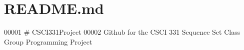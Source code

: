 \hypertarget{README_8md_source}{}\section{R\+E\+A\+D\+M\+E.\+md}

\begin{DoxyCode}
00001 # CSCI331Project
00002 Github for the CSCI 331 Sequence Set Class Group Programming Project 
\end{DoxyCode}
